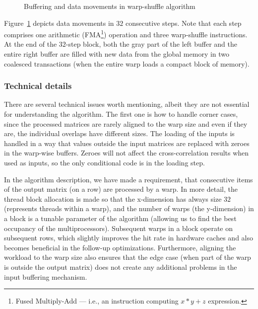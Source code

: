 \begin{figure}[ht]
	\centering
	\def\svgwidth{0.9\textwidth}
	\fontsize{9}{12}\selectfont
	
	\caption{Buffering and data movements in warp-shuffle algorithm}
	\label{fig:warpshuffle-overview}
\end{figure}

Figure~\ref{fig:warpshuffle-overview} depicts data movements in $32$ consecutive steps. Note that each step comprises one arithmetic (FMA\footnote{Fused Multiply-Add --- i.e., an instruction computing $x*y+z$ expression.}) operation and three warp-shuffle instructions. At the end of the $32$-step block, both the gray part of the left buffer and the entire right buffer are filled with new data from the global memory in two coalesced transactions (when the entire warp loads a compact block of memory).


\subsubsection{Technical details}\label{sub:ws-technical-details}

There are several technical issues worth mentioning, albeit they are not essential for understanding the algorithm. The first one is how to handle corner cases, since the processed matrices are rarely aligned to the warp size and even if they are, the individual overlaps have different sizes. The loading of the inputs is handled in a way that values outside the input matrices are replaced with zeroes in the warp-wise buffers. Zeroes will not affect the cross-correlation results when used as inputs, so the only conditional code is in the loading step.

In the algorithm description, we have made a requirement, that consecutive items of the output matrix (on a row) are processed by a warp. In more detail, the thread block allocation is made so that the x-dimension has always size $32$ (represents threads within a warp), and the number of warps (the y-dimension) in a block is a tunable parameter of the algorithm (allowing us to find the best occupancy of the multiprocessors). Subsequent warps in a block operate on subsequent rows, which slightly improves the hit rate in hardware caches and also becomes beneficial in the follow-up optimizations. Furthermore, aligning the workload to the warp size also ensures that the edge case (when part of the warp is outside the output matrix) does not create any additional problems in the input buffering mechanism.

